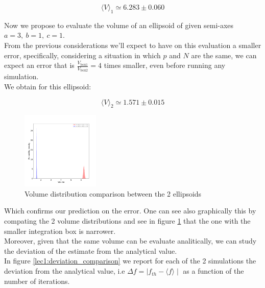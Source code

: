 $$\langle V \rangle_1 \simeq 6.283 \pm 0.060$$

Now we propose to evaluate the volume of an ellipsoid of given semi-axes $a=3,\ b=1,\ c=1$. \\
From the previous considerations we'll expect to have on this evaluation a smaller error, specifically, considering a situation in which $p$
and $N$ are the same, we can expect an error that is $\frac{V_{\text{box1}}}{V_{\text{box2}}} = 4$ times smaller, even before running any simulation. \\
We obtain for this ellipsoid:

$$\langle V \rangle_2 \simeq 1.571 \pm 0.015$$

\begin{figure}
  \centering
  \includegraphics[width=0.33\textwidth]{FIG/exercise_0_images/first_and_second_ellipsoid_distribution.png}
\caption{Volume distribution comparison between the 2 ellipsoids}
\label{lec1:first_and_second_ellipsoid}
\end{figure}

Which confirms our prediction on the error. One can see also graphically this by compating the 2 volume distributions and see in figure \ref{lec1:first_and_second_ellipsoid} that the one with the
smaller integration box is narrower. \\
Moreover, given that the same volume can be evaluate analitically, we can study the deviation of the estimate from the analytical value. \\
In figure \ref{lec1:deviation_comparison} we report for each of the 2 simulations the deviation from the analytical value, i.e $\Delta f = \mid f_{th}-\langle f \rangle \mid $ as a function
of the number of iterations. \\


